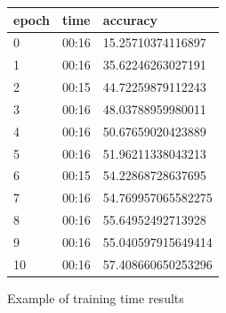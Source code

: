 \begin{figure}[h]
\centering
\begin{tabular}{ p{2cm} p{2cm} p{3.5cm}   }
 epoch&time&accuracy\\
 \hline
0&00:16&15.25710374116897\\
1&00:16&35.62246263027191\\
2&00:15&44.72259879112243\\
3&00:16&48.03788959980011\\
4&00:16&50.67659020423889\\
5&00:16&51.96211338043213\\
6&00:15&54.22868728637695\\
7&00:16&54.769957065582275\\
8&00:16&55.64952492713928\\
9&00:16&55.040597915649414\\
10&00:16&57.408660650253296\\
 \hline
\end{tabular}
\caption[Example of training time results]{Example of training time results}
\label{fig:m_fast_time}
\end{figure}

